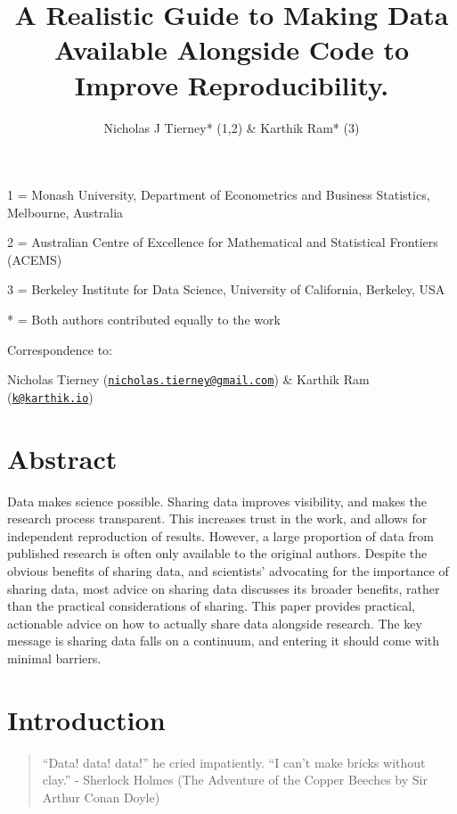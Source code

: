 \documentclass[
]{article}
\title{A Realistic Guide to Making Data Available Alongside Code to Improve Reproducibility.}
\author{Nicholas J Tierney* (1,2) \& Karthik Ram* (3)}
\date{}
\begin{document}
\maketitle

1 = Monash University, Department of Econometrics and Business Statistics, Melbourne, Australia

2 = Australian Centre of Excellence for Mathematical and Statistical Frontiers (ACEMS)

3 = Berkeley Institute for Data Science, University of California, Berkeley, USA

* = Both authors contributed equally to the work

Correspondence to:

Nicholas Tierney (\href{mailto:nicholas.tierney@gmail.com}{\nolinkurl{nicholas.tierney@gmail.com}}) \& Karthik Ram (\href{mailto:k@karthik.io}{\nolinkurl{k@karthik.io}})

\hypertarget{abstract}{%
\section*{Abstract}\label{abstract}}

Data makes science possible. Sharing data improves visibility, and makes the research process transparent. This increases trust in the work, and allows for independent reproduction of results. However, a large proportion of data from published research is often only available to the original authors. Despite the obvious benefits of sharing data, and scientists' advocating for the importance of sharing data, most advice on sharing data discusses its broader benefits, rather than the practical considerations of sharing. This paper provides practical, actionable advice on how to actually share data alongside research. The key message is sharing data falls on a continuum, and entering it should come with minimal barriers.

\hypertarget{intro}{%
\section{Introduction}\label{intro}}

\begin{quote}
``Data! data! data!'' he cried impatiently. ``I can't make bricks without clay.'' - Sherlock Holmes (The Adventure of the Copper Beeches by Sir Arthur Conan Doyle)
\end{quote}
\end{document}
